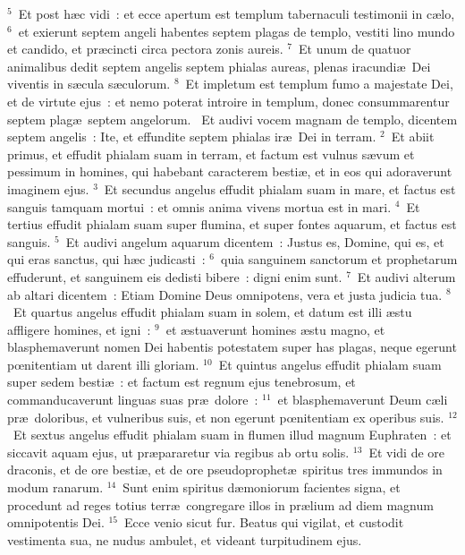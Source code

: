 ${}^{5}$~Et post h\ae c vidi~: et ecce apertum est templum tabernaculi testimonii in c\ae lo,
${}^{6}$~et exierunt septem angeli habentes septem plagas de templo, vestiti lino mundo et candido, et pr\ae cincti circa pectora zonis aureis.
${}^{7}$~Et unum de quatuor animalibus dedit septem angelis septem phialas aureas, plenas iracundi\ae\ Dei viventis in s\ae cula s\ae culorum.
${}^{8}$~Et impletum est templum fumo a majestate Dei, et de virtute ejus~: et nemo poterat introire in templum, donec consummarentur septem plag\ae\ septem angelorum.
~Et audivi vocem magnam de templo, dicentem septem angelis~: Ite, et effundite septem phialas ir\ae\ Dei in terram.
${}^{2}$~Et abiit primus, et effudit phialam suam in terram, et factum est vulnus s\ae vum et pessimum in homines, qui habebant caracterem besti\ae , et in eos qui adoraverunt imaginem ejus.
${}^{3}$~Et secundus angelus effudit phialam suam in mare, et factus est sanguis tamquam mortui~: et omnis anima vivens mortua est in mari.
${}^{4}$~Et tertius effudit phialam suam super flumina, et super fontes aquarum, et factus est sanguis.
${}^{5}$~Et audivi angelum aquarum dicentem~: Justus es, Domine, qui es, et qui eras sanctus, qui h\ae c judicasti~:
${}^{6}$~quia sanguinem sanctorum et prophetarum effuderunt, et sanguinem eis dedisti bibere~: digni enim sunt.
${}^{7}$~Et audivi alterum ab altari dicentem~: Etiam Domine Deus omnipotens, vera et justa judicia tua.
${}^{8}$~Et quartus angelus effudit phialam suam in solem, et datum est illi \ae stu affligere homines, et igni~:
${}^{9}$~et \ae stuaverunt homines \ae stu magno, et blasphemaverunt nomen Dei habentis potestatem super has plagas, neque egerunt pœnitentiam ut darent illi gloriam.
${}^{10}$~Et quintus angelus effudit phialam suam super sedem besti\ae~: et factum est regnum ejus tenebrosum, et commanducaverunt linguas suas pr\ae\ dolore~:
${}^{11}$~et blasphemaverunt Deum c\ae li pr\ae\ doloribus, et vulneribus suis, et non egerunt pœnitentiam ex operibus suis.
${}^{12}$~Et sextus angelus effudit phialam suam in flumen illud magnum Euphraten~: et siccavit aquam ejus, ut pr\ae pararetur via regibus ab ortu solis.
${}^{13}$~Et vidi de ore draconis, et de ore besti\ae , et de ore pseudoprophet\ae\ spiritus tres immundos in modum ranarum.
${}^{14}$~Sunt enim spiritus d\ae moniorum facientes signa, et procedunt ad reges totius terr\ae\ congregare illos in pr\ae lium ad diem magnum omnipotentis Dei.
${}^{15}$~Ecce venio sicut fur. Beatus qui vigilat, et custodit vestimenta sua, ne nudus ambulet, et videant turpitudinem ejus.
